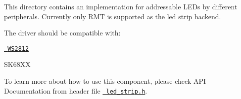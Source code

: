 This directory contains an implementation for addressable LEDs by different peripherals. Currently only RMT is supported as the led strip backend.

The driver should be compatible with\+:


\begin{DoxyItemize}
\item \href{http://www.world-semi.com/Certifications/WS2812B.html}{\texttt{ WS2812}}
\item SK68\+XX
\end{DoxyItemize}

To learn more about how to use this component, please check API Documentation from header file \href{./include/led_strip.h}{\texttt{ led\+\_\+strip.\+h}}. 